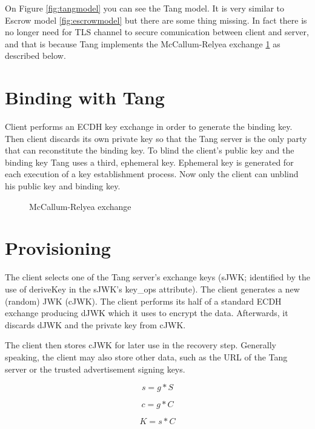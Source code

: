\documentclass[../xdudla00-porting-Tang-to-Open-WRT.tex]{subfiles}
\begin{document}
On Figure \ref{fig:tangmodel} you can see the Tang model.
It is very similar to Escrow model \ref{fig:escrowmodel} but there are some thing missing.
In fact there is no longer need for TLS channel to secure comunication between client and server, and that is because Tang implements the McCallum-Relyea exchange \ref{fig:mrexchange} as described below.

\section{Binding with Tang}

Client performs an ECDH \cite{ecdh} key exchange in order to generate the binding key.
Then client discards its own private key so that the Tang server is the only party that can reconstitute the binding key.
To blind the client's public key and the binding key Tang uses a third, ephemeral key.
Ephemeral key is generated for each execution of a key establishment process.
Now only the client can unblind his public key and binding key.

\begin{figure}[h]
    \centering
    \caption{McCallum-Relyea exchange}
    \label{fig:mrexchange}
\end{figure}

\section{Provisioning}
The client selects one of the Tang server's exchange keys (sJWK; identified by the use of deriveKey in the sJWK's key\_ops attribute).
The client generates a new (random) JWK (cJWK). The client performs its half of a standard ECDH exchange producing dJWK which it uses to encrypt the data.
Afterwards, it discards dJWK and the private key from cJWK.

The client then stores cJWK for later use in the recovery step.
Generally speaking, the client may also store other data, such as the URL of the Tang server or the trusted advertisement signing keys.

\begin{equation}
    s = g * S
\end{equation}

\begin{equation}
    c = g * C
\end{equation}

\begin{equation}
    K = s * C
\end{equation}
\end{document}
